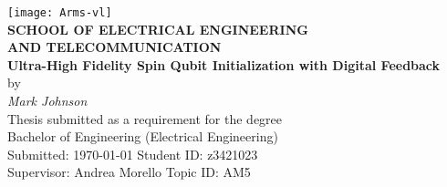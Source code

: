 \begin{center}
	\centering\texttt{[image: Arms-vl]}\\
	[0.5cm]
\textbf{\large SCHOOL OF ELECTRICAL ENGINEERING\\
AND TELECOMMUNICATION}\\[2cm]
{\addtolength{\baselineskip}{0.5cm}
\textbf{\Huge
Ultra-High Fidelity Spin Qubit Initialization with Digital Feedback} \\[0.5cm]
}
{\Large by}\\[0.5cm]
\textit{\huge
Mark Johnson} \\[1.5cm]
{\Large
	Thesis submitted as a requirement for the degree\\
	Bachelor of Engineering (Electrical Engineering)\\[2ex]
\vfill
Submitted: \today\hfill
Student ID: z3421023\\[-1.0ex]
Supervisor: Andrea Morello\hfill
Topic ID: AM5\\
\vspace*{-1cm}
}
\end{center}